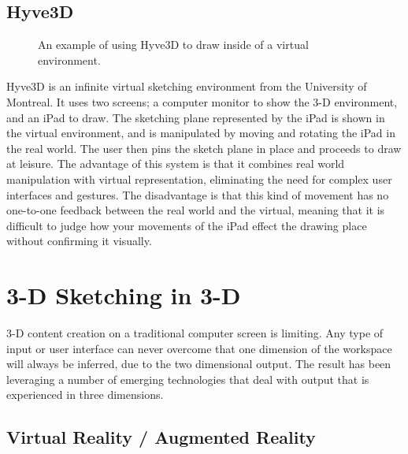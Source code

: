 \subsection{Hyve3D}

\begin{figure}
\centering     %
{}
\caption{An example of using Hyve3D to draw inside of a virtual environment. \autocite{hyve3d}}

\end{figure}

Hyve3D\autocite{hyve3d} is an infinite virtual sketching environment from the University of Montreal. It uses two screens; a computer monitor to show the 3-D environment, and an iPad to draw. The sketching plane represented by the iPad is shown in the virtual environment, and is manipulated by moving and rotating the iPad in the real world. The user then pins the sketch plane in place and proceeds to draw at leisure. The advantage of this system is that it combines real world manipulation with virtual representation, eliminating the need for complex user interfaces and gestures. The disadvantage is that this kind of movement has no one-to-one feedback between the real world and the virtual, meaning that it is difficult to judge how your movements of the iPad effect the drawing place without confirming it visually.



\section{3-D Sketching in 3-D}

3-D content creation on a traditional computer screen is limiting. 
Any type of input or user interface can never overcome that one dimension of the workspace will always be inferred, due to the two dimensional output.
The result has been leveraging a number of emerging technologies that deal with output that is experienced in three dimensions. 


\subsection{Virtual Reality / Augmented Reality}

